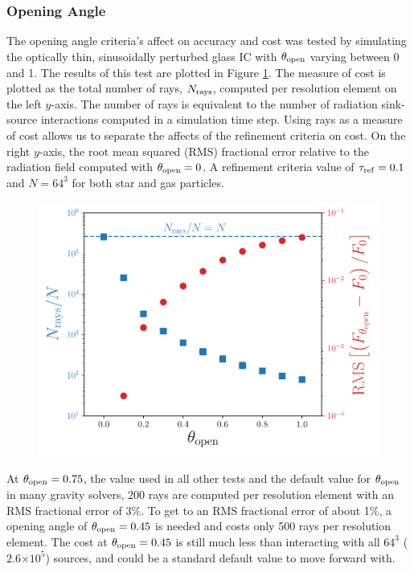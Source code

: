 \documentclass[fleq,usenatbib]{mnras}
\providecommand{\e}[1]{\ensuremath{\times10^{#1}}}
\newcommand{\tr}{\tau_{\rm ref}}
\newcommand{\tO}{\theta_{\rm open}}
\begin{document}
\subsubsection{Opening Angle}
The opening angle criteria's affect on accuracy and cost was tested by 
simulating the optically thin, sinusoidally perturbed glass IC with $\tO$ 
varying between 0 and 1. The results of this test are plotted in Figure 
\ref{fig:openangle}. The measure of cost is plotted as the total number of 
rays, $N_{\rm rays}$, computed per resolution element on the left $y$-axis. 
The number of rays is equivalent to the number of radiation sink-source 
interactions computed in a simulation time step. Using rays as a measure of 
cost allows us to separate the affects of the refinement criteria on cost. On 
the right $y$-axis, the root mean squared (RMS) fractional error relative to 
the radiation field computed with $\tO=0$. A refinement criteria 
value of $\tr = 0.1$ and $N=64^3$ for both star and gas particles.
\begin{figure}
\includegraphics[width=1\linewidth]{Figures/opening_angle.pdf}
\caption{}
\label{fig:openangle}
\end{figure}

At $\tO=0.75$, the value used in all other tests and the 
default value for $\tO$ in many gravity solvers, 200 rays are 
computed per resolution element with an RMS fractional error of 3\%. To get to 
an RMS fractional error of about 1\%, a opening angle of $\tO=0.45$ is needed 
and costs only 500 rays per resolution element. The cost at 
$\tO=0.45$ is still much less than interacting with all $64^3$ 
($2.6\e{5}$) sources, and could be a standard default value to move forward 
with.
\end{document}

